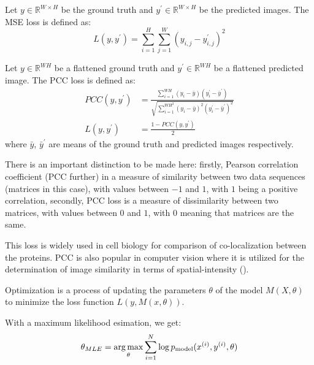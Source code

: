 \begin{definition}
	Let $y \in \mathbb{R}^{W \times H}$ be the ground truth and $y^\prime \in \mathbb{R}^{W \times H}$ be the predicted images. The MSE loss is defined as:
	\begin{equation}
		L(y, y^\prime) = \sum_{i=1}^{H} \sum_{j=1}^{W} (y_{i, j} - y_{i, j}^\prime)^2
	\end{equation}
\end{definition}

\begin{definition}
	\label{def:pcc-loss}
	Let $y \in \mathbb{R}^{WH}$ be a flattened ground truth and $y^\prime \in \mathbb{R}^{WH}$ be a flattened predicted image. The PCC loss is defined as:
	\begin{align}
		PCC(y, y^\prime) &= \frac{\sum_{i=1}^{{WH}}{(y_i - \bar{y})(y_i^\prime - \bar{y}^\prime)}}{\sqrt{\sum_{i=1}^{{WH}^2}{(y_i - \bar{y})^2(y_i^\prime - \bar{y}^\prime)^2}}}  \\
		L(y, y^\prime) &= \frac{1 - PCC(y, y^\prime)}{2}
	\end{align}
	where $\bar{y}$, $\bar{y}^\prime$ are means of the ground truth and predicted images respectively.
	
	There is an important distinction to be made here: firstly, Pearson correlation coefficient (PCC further) in a measure of similarity between two data sequences (matrices in this case), with values between $-1$ and $1$, with $1$ being a positive correlation, secondly, PCC loss is a measure of dissimilarity between two matrices, with values between $0$ and $1$, with $0$ meaning that matrices are the same.

	This loss is widely used in cell biology for comparison of co-localization between the proteins. PCC is also popular in computer vision where it is utilized for the determination of image similarity in terms of spatial-intensity (\cite{Lachance_2020}).
\end{definition}

\begin{definition}[Optimization]
	Optimization is a process of updating the parameters $\theta$ of the model $M(X, \theta)$ to minimize the loss function $L(y, M(x, \theta))$.
\end{definition}

With a maximum likelihood esimation, we get:
\begin{equation}
	\theta_{MLE} = \operatorname*{arg\,max}\limits_{\theta} \sum_{i=1}^{N} \log{p_{\text{model}}(x^{(i)}, y^{(i)}, \theta)}
\end{equation}

